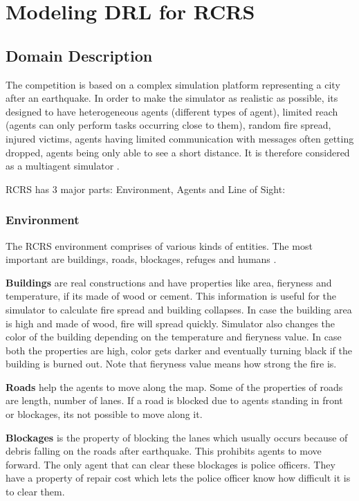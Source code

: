 \documentclass[12pt]{report}
\begin{document}
\chapter{Modeling DRL for RCRS}

\section{Domain Description}

The competition is based on a complex simulation platform representing a city after an earthquake. In order to make the simulator as realistic as possible, its designed to have heterogeneous agents (different types of agent), limited reach (agents can only perform tasks occurring close to them), random fire spread, injured victims, agents having limited communication with messages often getting dropped, agents being only able to see a short distance. It is therefore considered as a multiagent simulator \cite{Kitano}.  

RCRS has 3 major parts: Environment, Agents and Line of Sight:

\subsection{Environment}

The RCRS environment comprises of various kinds of entities. The most important are buildings, roads, blockages, refuges and humans \cite{Morimoto}. 


\textbf{Buildings} are real constructions and have properties like area, fieryness and temperature, if its made of wood or cement. This information is useful for the simulator to calculate fire spread and building collapses. In case the building area is high and made of wood, fire will spread quickly. Simulator also changes the color of the building depending on the temperature and fieryness value. In case both the properties are high, color gets darker and eventually turning black if the building is burned out. Note that fieryness value means how strong the fire is. 

\textbf{Roads} help the agents to move along the map. Some of the properties of roads are length, number of lanes. If a road is blocked due to agents standing in front or blockages, its not possible to move along it. 

\textbf{Blockages} is the property of blocking the lanes which usually occurs because of debris falling on the roads after earthquake. This prohibits agents to move forward. The only agent that can clear these blockages is police officers. They have a property of repair cost which lets the police officer know how difficult it is to clear them. 
\end{document}
